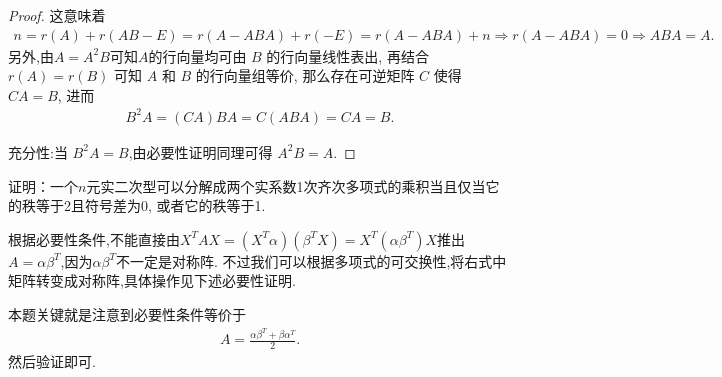 \documentclass[../../main.tex]{subfiles}%
\begin{document}
\begin{proof}
这意味着
\begin{align*}
n = r(A) + r(AB - E) = r(A - ABA) + r(-E) = r(A - ABA) + n\Longrightarrow r(A - ABA) = 0\Longrightarrow ABA = A.
\end{align*}
另外,由\(A = A^2B\)可知$A$的行向量均可由 \(B\) 的行向量线性表出, 再结合 \(r(A) = r(B)\) 可知 \(A\) 和 \(B\) 的行向量组等价, 那么存在可逆矩阵 \(C\) 使得 \(CA = B\), 进而
\begin{align*}
B^2A = (CA)BA = C(ABA) = CA = B.
\end{align*}

{\heiti 充分性:}当 \(B^2A = B\),由必要性证明同理可得 \(A^2B = A\).
\end{proof}

\begin{example}
证明：一个$n$元实二次型可以分解成两个实系数1次齐次多项式的乘积当且仅当它的秩等于2且符号差为0, 或者它的秩等于1.
\end{example}
\begin{note}
根据必要性条件,不能直接由$X^TAX=( X^T\alpha ) ( \beta ^TX ) =X^T( \alpha \beta ^T ) X$推出$A=\alpha \beta ^T$,因为$\alpha \beta ^T$不一定是对称阵.
不过我们可以根据多项式的可交换性,将右式中矩阵转变成对称阵,具体操作见下述必要性证明.

本题关键就是注意到必要性条件等价于
\begin{align*}
A=\frac{\alpha \beta ^T+\beta \alpha ^T}{2}.
\end{align*}
然后验证即可.
\end{note}
\end{document}
